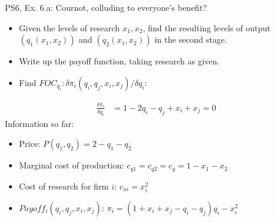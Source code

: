 \begin{frame}{PS6, Ex. 6.a: Cournot, colluding to everyone's benefit?}
    \begin{itemize}
    \item[(a)] Given the levels of research $x_1,x_2$, find the resulting levels of output $(q_1(x_1, x_2))$ and $(q_2(x_1, x_2))$ in the second stage.
    \end{itemize}
  \begin{multicols}{2}
    \begin{itemize}
      \item[(Step a)] Write up the payoff function, taking research as given.
      \item[(Step b)] Find $FOC_{q_i}:\delta\pi_i(q_i,q_j,x_i,x_j)/\delta q_i$:
    \end{itemize}
    \begin{align*}
      \frac{\delta\pi_i}{\delta q_i}&=1-2q_i-q_j+x_i+x_j=0
    \end{align*}
    \vfill\null \columnbreak
    Information so far:
    \begin{itemize}
      \item[1] Price: $P(q_1,q_2)=2-q_1-q_2$
      \item[2] Marginal cost of production: $c_{q1} = c_{q2} = c_q =1 - x_1 - x_2$
      \item[3] Cost of research for firm $i$: $c_{xi}=x_i^2$
      \item[4] $Payoff_i(q_i,q_j,x_i,x_j)$: $\pi_i=(1+x_i+x_j-q_i-q_j)q_i-x_i^2$
    \end{itemize}
    \vfill\null
  \end{multicols}
\end{frame}

